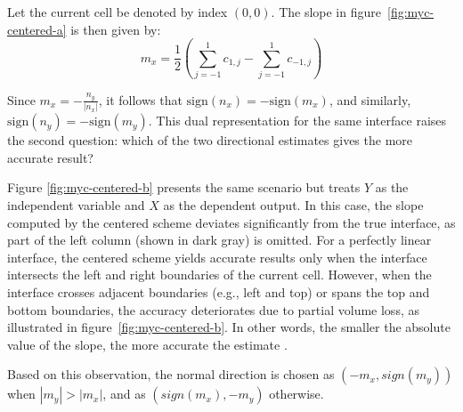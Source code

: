 Let the current cell be denoted by index $(0, 0)$. The slope in figure~\ref{fig:myc-centered-a} is then given by:
\begin{equation}
m_x = \frac{1}{2} \left(\sum_{j=-1}^{1} c_{1,j} - \sum_{j=-1}^{1} c_{-1,j} \right)
\end{equation}

Since $m_x = -\frac{n_y}{|n_x|}$, it follows that $\text{sign}(n_x) = -\text{sign}(m_x)$, and similarly, $\text{sign}(n_y) = -\text{sign}(m_y)$. This dual representation for the same interface raises the second question: which of the two directional estimates gives the more accurate result?

Figure \ref{fig:myc-centered-b} presents the same scenario but treats $Y$ as the independent variable and $X$ as the dependent output. In this case, the slope computed by the centered scheme deviates significantly from the true interface, as part of the left column (shown in dark gray) is omitted. For a perfectly linear interface, the centered scheme yields accurate results only when the interface intersects the left and right boundaries of the current cell. However, when the interface crosses adjacent boundaries (e.g., left and top) or spans the top and bottom boundaries, the accuracy deteriorates due to partial volume loss, as illustrated in figure~\ref{fig:myc-centered-b}. In other words, the smaller the absolute value of the slope, the more accurate the estimate \cite{2007_Aulisa}.

Based on this observation, the normal direction is chosen as $(-m_x, sign(m_y))$ when $|m_y| > |m_x|$, and as $(sign(m_x), -m_y)$ otherwise.

\printbibliography

